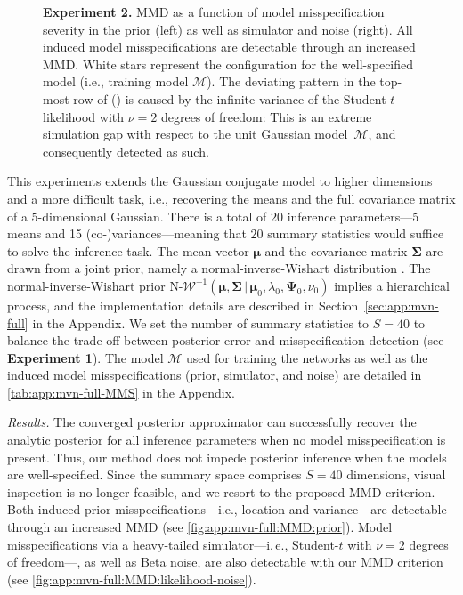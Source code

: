 \documentclass[twoside,11pt]{article}
\newcommand{\numberGaussianMeans}{1}
\newcommand{\numberGaussianMeansCov}{2}
\newcommand{\mub}{\boldsymbol{\mu}}
\newcommand{\Sigmab}{\boldsymbol{\Sigma}}
\newcommand{\Psib}{\boldsymbol{\Psi}}
\newcommand{\0}{\boldsymbol{0}}
\newcommand{\given}{\,|\,}
\newcommand{\NIW}{\text{N-}\mathcal{W}^{-1}}
\newcommand{\M}{\mathcal{M}}
\newcommand{\ie}{i.\,e.}
\begin{document}
\begin{figure}[t]
\begin{minipage}{.48\linewidth}
\begin{subfigure}[t]{\linewidth}
            \label{fig:app:mvn-full:MMD:likelihood-noise}
        \end{subfigure}
    \end{minipage}
    \hspace*{1cm}
\caption{\textbf{Experiment \numberGaussianMeansCov.} MMD as a function of model misspecification severity in the prior (left) as well as simulator and noise (right). 
All induced model misspecifications are detectable through an increased MMD.
White stars represent the configuration for the well-specified model (i.e., training model $\M$).
The deviating pattern in the top-most row of () is caused by the infinite variance of the Student $t$ likelihood with $\nu=2$ degrees of freedom: This is an extreme simulation gap with respect to the unit Gaussian model~$\M$, and consequently detected as such.}
\label{fig:app:mvn-full:MMD}
\end{figure}
This experiments extends the Gaussian conjugate model to higher dimensions and a more difficult task, i.e., recovering the means and the full covariance matrix of a $5$-dimensional Gaussian.
There is a total of $20$ inference parameters---5 means and 15 (co-)variances---meaning that $20$ summary statistics would suffice to solve the inference task.
The mean vector $\mub$ and the covariance matrix $\Sigmab$ are drawn from a joint prior, namely a normal-inverse-Wishart distribution \citep[$\NIW$;][]{Barnard2000}.
The normal-inverse-Wishart prior $\NIW(\mub, \Sigmab\given\mub_0, \lambda_0, \Psib_0, \nu_0)$ implies a hierarchical process, and the implementation details are described in Section~\ref{sec:app:mvn-full} in the Appendix.
We set the number of summary statistics to $S=40$ to balance the trade-off between posterior error and misspecification detection (see \textbf{Experiment \numberGaussianMeans}).
The model $\mathcal{M}$ used for training the networks as well as the induced model misspecifications (prior, simulator, and noise) are detailed in \autoref{tab:app:mvn-full-MMS} in the Appendix.

\textit{Results.} The converged posterior approximator can successfully recover the analytic posterior for all inference parameters when no model misspecification is present.
Thus, our method does not impede posterior inference when the models are well-specified.
Since the summary space comprises $S=40$ dimensions, visual inspection is no longer feasible, and we resort to the proposed MMD criterion.
Both induced prior misspecifications---i.e., location and variance---are detectable through an increased MMD (see \autoref{fig:app:mvn-full:MMD:prior}).
Model misspecifications via a heavy-tailed simulator---\ie, Student-$t$ with $\nu=2$ degrees of freedom---, as well as Beta noise, are also detectable with our MMD criterion (see \autoref{fig:app:mvn-full:MMD:likelihood-noise}).
\end{document}
